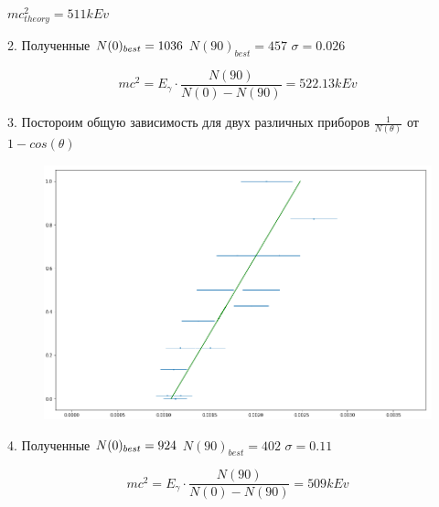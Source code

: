\documentclass{article}
\theoremstyle{remark}
\begin{document}
$mc^2_{theory} = 511 kEv$

2. Полученные $N(0)_{best} = 1036\\$
$N(90)_{best} = 457$
$\sigma = 0.026$

\begin{equation}
    mc^2 = E_\gamma \cdot \frac{N(90)}{N(0) - N(90)} = 522.13 kEv
\end{equation}


3. Постороим общую зависимость для двух различных приборов  $\frac{1}{N(\theta)}$ от $1 - cos(\theta)$
\begin{figure}[htp]
    \includegraphics[width=1.2\linewidth]{35.png}
\end{figure}

4. Полученные $N(0)_{best} = 924\\$
$N(90)_{best} = 402$
$\sigma = 0.11$

\begin{equation}
    mc^2 = E_\gamma \cdot \frac{N(90)}{N(0) - N(90)} = 509  kEv
\end{equation}
\end{document}
